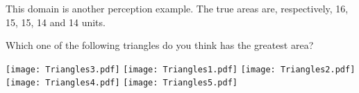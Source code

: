 This domain is another perception example.
The true areas are, respectively, 16, 15, 15, 14 and 14 units.

\begin{tcolorbox}
	Which one of the following triangles do you think has the greatest area?

	\texttt{[image: Triangles3.pdf]}
	\texttt{[image: Triangles1.pdf]}
	\texttt{[image: Triangles2.pdf]}
	\texttt{[image: Triangles4.pdf]}
	\texttt{[image: Triangles5.pdf]}	
\end{tcolorbox}
